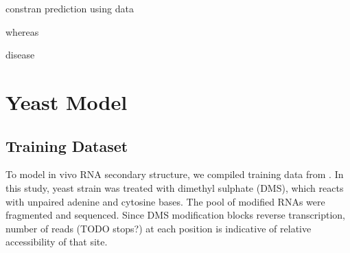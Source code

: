 \documentclass{proposal}
\begin{document}
constran prediction using data

whereas

disease

%
%
%
%
%
%
%
%
%
%
%
%
%
%





%
%
%
%
%
%
%




%
%

\chapter{Yeast Model}

\section{Training Dataset}

To model in vivo RNA secondary structure, we compiled training data from \cite{rouskin2014genome}.
In this study, yeast strain was treated with ﻿dimethyl sulphate (DMS), which reacts with ﻿unpaired adenine and cytosine bases.
The pool of modified RNAs were fragmented and sequenced.
Since ﻿DMS modification blocks reverse transcription, ﻿
number of reads (TODO stops?) at each position is indicative of relative accessibility of that site.
\end{document}
